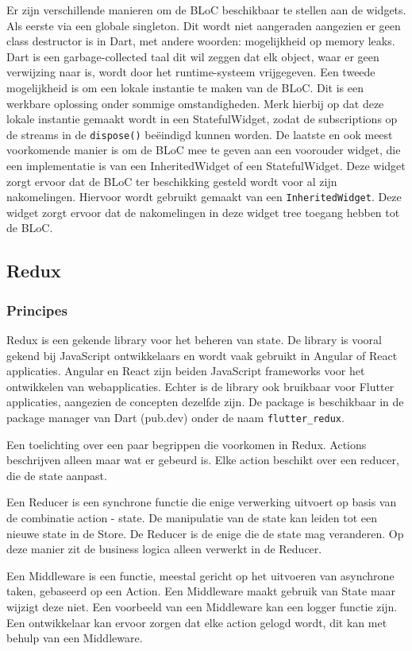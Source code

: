 Er zijn verschillende manieren om de BLoC beschikbaar te stellen aan de widgets. 
Als eerste via een globale singleton. Dit wordt niet aangeraden aangezien er geen class destructor is in Dart, met andere woorden: mogelijkheid op memory leaks. Dart is een garbage-collected taal dit wil zeggen dat elk object, waar er geen verwijzing naar is, wordt door het runtime-systeem vrijgegeven. 
Een tweede mogelijkheid is om een lokale instantie te maken van de BLoC. Dit is een werkbare oplossing onder sommige omstandigheden. Merk hierbij op dat deze lokale instantie gemaakt wordt in een StatefulWidget, zodat de subscriptions op de streams in de \verb|dispose()| beëindigd kunnen worden.
De laatste en ook meest voorkomende manier is om de BLoC mee te geven aan een voorouder widget, die een implementatie is van een InheritedWidget of een StatefulWidget. Deze widget zorgt ervoor dat de BLoC ter beschikking gesteld wordt voor al zijn nakomelingen. Hiervoor wordt gebruikt gemaakt van een \verb|InheritedWidget|. Deze widget zorgt ervoor dat de nakomelingen in deze widget tree toegang hebben tot de BLoC.

\subsection{Redux}
\label{ch:redux}
\subsubsection{Principes}
Redux is een gekende library voor het beheren van state. De library is vooral gekend bij JavaScript ontwikkelaars en wordt vaak gebruikt in Angular of React applicaties. Angular en React zijn beiden JavaScript frameworks voor het ontwikkelen van webapplicaties. Echter is de library ook bruikbaar voor Flutter applicaties, aangezien de concepten dezelfde zijn. De package is beschikbaar in de package manager van Dart (pub.dev) onder de naam \verb|flutter_redux|.

Een toelichting over een paar begrippen die voorkomen in Redux.
Actions beschrijven alleen maar wat er gebeurd is. Elke action beschikt over een reducer, die de state aanpast.

Een Reducer is een synchrone functie die enige verwerking uitvoert op basis van de combinatie action - state. De manipulatie van de state kan leiden tot een nieuwe state in de Store. De Reducer is de enige die de state mag veranderen. Op deze manier zit de business logica alleen verwerkt in de Reducer. 

Een Middleware is een functie, meestal gericht op het uitvoeren van asynchrone taken, gebaseerd op een Action. Een Middleware maakt gebruik van State maar wijzigt deze niet. Een voorbeeld van een Middleware kan een logger functie zijn. Een ontwikkelaar kan ervoor zorgen dat elke action gelogd wordt, dit kan met behulp van een Middleware.

